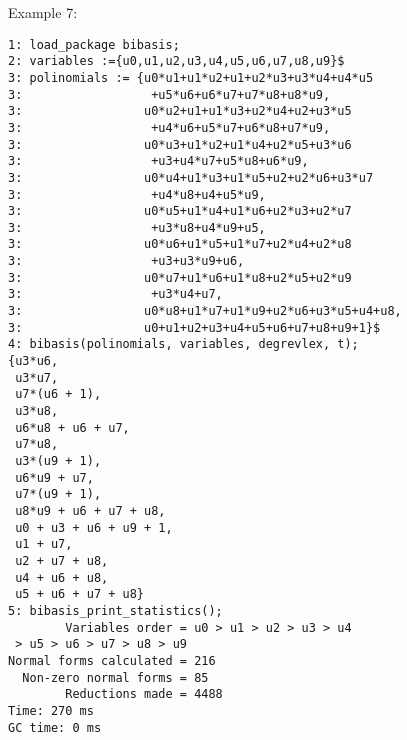 \noindent Example 7:
\begin{verbatim}
1: load_package bibasis;
2: variables :={u0,u1,u2,u3,u4,u5,u6,u7,u8,u9}$
3: polinomials := {u0*u1+u1*u2+u1+u2*u3+u3*u4+u4*u5
3:                  +u5*u6+u6*u7+u7*u8+u8*u9,
3:                 u0*u2+u1+u1*u3+u2*u4+u2+u3*u5
3:                  +u4*u6+u5*u7+u6*u8+u7*u9,
3:                 u0*u3+u1*u2+u1*u4+u2*u5+u3*u6
3:                  +u3+u4*u7+u5*u8+u6*u9,
3:                 u0*u4+u1*u3+u1*u5+u2+u2*u6+u3*u7
3:                  +u4*u8+u4+u5*u9,
3:                 u0*u5+u1*u4+u1*u6+u2*u3+u2*u7
3:                  +u3*u8+u4*u9+u5,
3:                 u0*u6+u1*u5+u1*u7+u2*u4+u2*u8
3:                  +u3+u3*u9+u6,
3:                 u0*u7+u1*u6+u1*u8+u2*u5+u2*u9
3:                  +u3*u4+u7,
3:                 u0*u8+u1*u7+u1*u9+u2*u6+u3*u5+u4+u8,
3:                 u0+u1+u2+u3+u4+u5+u6+u7+u8+u9+1}$
4: bibasis(polinomials, variables, degrevlex, t);
{u3*u6,
 u3*u7,
 u7*(u6 + 1),
 u3*u8,
 u6*u8 + u6 + u7,
 u7*u8,
 u3*(u9 + 1),
 u6*u9 + u7,
 u7*(u9 + 1),
 u8*u9 + u6 + u7 + u8,
 u0 + u3 + u6 + u9 + 1,
 u1 + u7,
 u2 + u7 + u8,
 u4 + u6 + u8,
 u5 + u6 + u7 + u8}
5: bibasis_print_statistics();
        Variables order = u0 > u1 > u2 > u3 > u4
 > u5 > u6 > u7 > u8 > u9
Normal forms calculated = 216
  Non-zero normal forms = 85
        Reductions made = 4488
Time: 270 ms
GC time: 0 ms
\end{verbatim}
